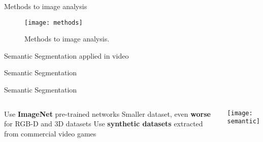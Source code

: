 \begin{frame}[t]{Methods to image analysis}
    \begin{figure}
        \centering
        \texttt{[image: methods]}
        \caption{Methods to image analysis. \cite{lin2014microsoft}}
    \end{figure}
\end{frame}

\begin{frame}[c]{Semantic Segmentation applied in video}
    \centering

    Semantic Segmentation \cite{semseg}
\end{frame}

\begin{frame}[t]{Semantic Segmentation}
    \begin{columns}[c]
            \newline
            \newline
                Use \textbf{ImageNet} pre-trained networks
            \newline
            \newline
                Smaller dataset, even \textbf{worse} for RGB-D and 3D datasets
            \newline
            \newline
                Use \textbf{synthetic datasets} extracted from commercial video games
           
        \newline
        \newline
        \newline
        \newline
        \begin{flushright}
            \texttt{[image: semantic]}
        \end{flushright} 
    \end{columns}
    
\end{frame}